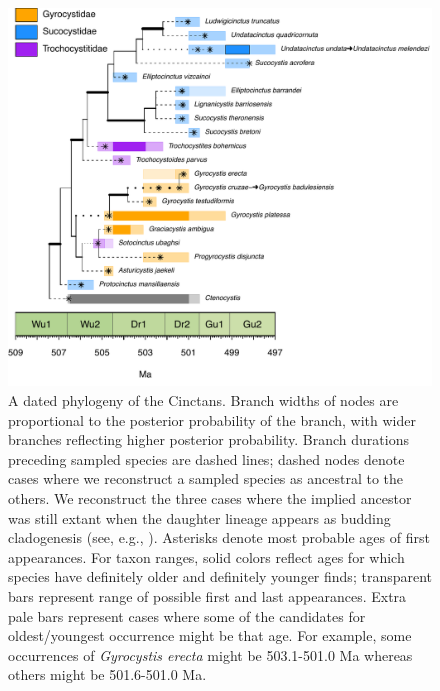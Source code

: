 \documentclass{article}
\begin{document}
\begin{figure}
  \includegraphics[width=\textwidth]{figures/Pretty Cinctans Families.pdf}

  \caption{A dated phylogeny of the Cinctans. Branch widths of nodes are proportional to the posterior probability of the branch, with wider branches reflecting higher posterior probability. Branch durations preceding sampled species are dashed lines; dashed nodes denote cases where we reconstruct a sampled species as ancestral to the others.  We reconstruct the three cases where the implied ancestor was still extant when the daughter lineage appears as budding cladogenesis (see, e.g., \citep{Eldredge1971}).  Asterisks denote most probable ages of first appearances.  For taxon ranges, solid colors reflect ages for which species have definitely older and definitely younger finds; transparent bars represent range of possible first and last appearances.  Extra pale bars represent cases where some of the candidates for oldest/youngest occurrence might be that age. For example,  some occurrences of \textit{Gyrocystis erecta} might be 503.1-501.0 Ma whereas others might be 501.6-501.0 Ma.  }
\end{figure}
\end{document}
